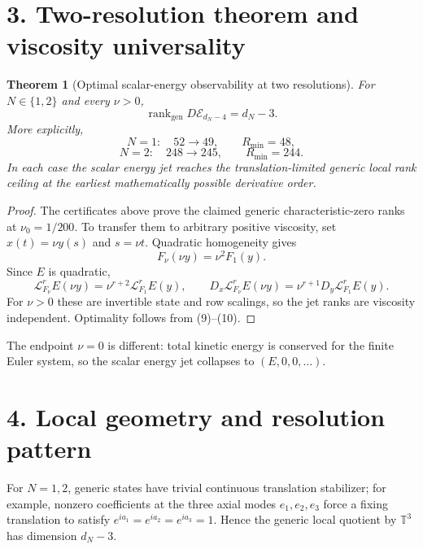 \documentclass[10pt,leqno,twoside]{article}
\newcommand{\T}{\mathbb T}
\newcommand{\Lie}{\mathcal L}
\newcommand{\rankgen}{\operatorname{rank}_{\mathrm{gen}}}
\theoremstyle{plain}
\newtheorem{theorem}{Theorem}
\theoremstyle{remark}
\begin{document}
\section*{3. Two-resolution theorem and viscosity universality}

\begin{theorem}[Optimal scalar-energy observability at two resolutions]
For $N\in\{1,2\}$ and every $\nu>0$,
\begin{equation}
\boxed{\rankgen D\mathcal E_{d_N-4}=d_N-3.}
\end{equation}
More explicitly,
\begin{equation}
\boxed{
N=1:\quad 52\longrightarrow49,\qquad R_{\min}=48,
}
\end{equation}
\begin{equation}
\boxed{
N=2:\quad 248\longrightarrow245,\qquad R_{\min}=244.
}
\end{equation}
In each case the scalar energy jet reaches the translation-limited generic local rank ceiling
at the earliest mathematically possible derivative order.
\end{theorem}

\begin{proof}
The certificates above prove the claimed generic characteristic-zero ranks at
$\nu_0=1/200$.  To transfer them to arbitrary positive viscosity, set
$x(t)=\nu y(s)$ and $s=\nu t$.  Quadratic homogeneity gives
\begin{equation}
F_\nu(\nu y)=\nu^2F_1(y).
\end{equation}
Since $E$ is quadratic,
\begin{equation}
\Lie_{F_\nu}^rE(\nu y)=\nu^{r+2}\Lie_{F_1}^rE(y),
\qquad
D_x\Lie_{F_\nu}^rE(\nu y)=\nu^{r+1}D_y\Lie_{F_1}^rE(y).
\end{equation}
For $\nu>0$ these are invertible state and row scalings, so the jet ranks are viscosity
independent.  Optimality follows from (9)--(10).
\end{proof}

The endpoint $\nu=0$ is different: total kinetic energy is conserved for the finite Euler
system, so the scalar energy jet collapses to $(E,0,0,\ldots)$.

\section*{4. Local geometry and resolution pattern}

For $N=1,2$, generic states have trivial continuous translation stabilizer; for example,
nonzero coefficients at the three axial modes $e_1,e_2,e_3$ force a fixing translation to
satisfy $e^{ia_1}=e^{ia_2}=e^{ia_3}=1$.  Hence the generic local quotient by $\T^3$ has
dimension $d_N-3$.
\end{document}
